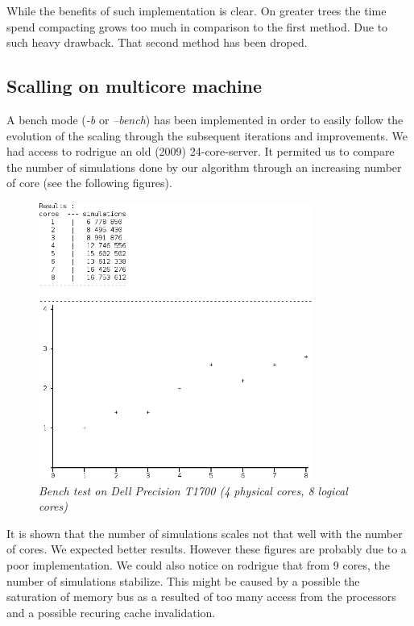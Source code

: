 While the benefits of such implementation is clear. On greater trees the time spend compacting grows too much in comparison to the first method. Due to such heavy drawback. That second method has been droped.

\subsection{Scalling on multicore machine}

A bench mode (\textit{-b} or \textit{--bench}) has been implemented in order to easily follow the evolution of the scaling through the subsequent iterations and improvements. We had access to rodrigue an old (2009) 24-core-server. It permited us to compare the number of simulations done by our algorithm through an increasing number of core (see the following figures).

\begin{figure}[H] 
\centerline{\includegraphics[width=0.8\textwidth]{Optimisations/bench_T1700.png}}
\caption{\label{fig:Defrag}\textit{Bench test on Dell Precision T1700 (4 physical cores, 8 logical cores)}}
\end{figure}

It is shown that the number of simulations scales not that well with the number of cores. We expected better results. However these figures are probably due to a poor implementation.
We could also notice on rodrigue that from 9 cores, the number of simulations stabilize. This might be caused by a possible the saturation of memory bus as a resulted of too many access from the processors and a possible recuring cache invalidation.

